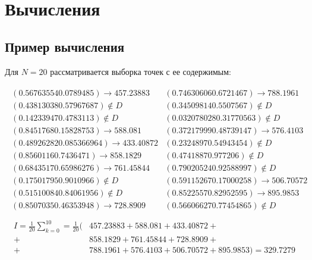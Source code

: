 \section{Вычисления}
\subsection{Пример вычисления}
Для \(N = 20\) рассматривается выборка точек с ее содержимым:

\begin{align*}
	\begin{array}{ll}
		(0.56763554 0.0789485) \to 457.23883   & (0.74630606 0.6721467) \to 788.1961   \\
		(0.43813038 0.57967687) \not\in D      & (0.34509814 0.5507567) \not\in D      \\
		(0.14233947 0.4783113) \not\in D       & (0.032078028 0.31770563) \not\in D    \\
		(0.8451768 0.15828753) \to 588.081     & (0.37217999 0.48739147) \to 576.4103  \\
		(0.48926282 0.085366964) \to 433.40872 & (0.2324897 0.54943454) \not\in D      \\
		(0.8560116 0.7436471) \to 858.1829     & (0.4741887 0.977206) \not\in D        \\
		(0.6843517 0.65986276) \to 761.45844   & (0.79020524 0.92588997) \not\in D     \\
		(0.17501795 0.9010966) \not\in D       & (0.59115267 0.17000258) \to 506.70572 \\
		(0.51510084 0.84061956) \not\in D      & (0.8522557 0.82952595) \to 895.9853   \\
		(0.8507035 0.46353948) \to 728.8909    & (0.56606627 0.77454865) \not\in D     \\
	\end{array}
\end{align*}
\begin{align*}
	I = \frac{1}{20}\sum_{k=0}^{10}=\frac{1}{20}( & 457.23883+588.081+433.40872+                     \\
	+                                             & 858.1829+761.45844+728.8909+                     \\
	+                                             & 788.1961+576.4103+506.70572+895.9853) = 329.7279
\end{align*}

